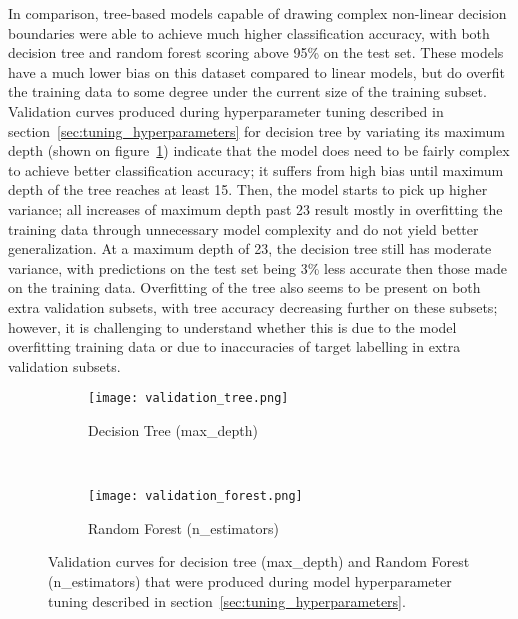In comparison, tree-based models capable of drawing complex non-linear decision boundaries were able to achieve much higher classification accuracy, with both decision tree and random forest scoring above 95\% on the test set.
These models have a much lower bias on this dataset compared to linear models, but do overfit the training data to some degree under the current size of the training subset.
Validation curves produced during hyperparameter tuning described in section~\ref{sec:tuning_hyperparameters} for decision tree by variating its maximum depth (shown on figure~\ref{fig:validation_tree}) indicate that the model does need to be fairly complex to achieve better classification accuracy;
it suffers from high bias until maximum depth of the tree reaches at least 15.
Then, the model starts to pick up higher variance;
all increases of maximum depth past 23 result mostly in overfitting the training data through unnecessary model complexity and do not yield better generalization.
At a maximum depth of 23, the decision tree still has moderate variance, with predictions on the test set being 3\% less accurate then those made on the training data.
Overfitting of the tree also seems to be present on both extra validation subsets, with tree accuracy decreasing further on these subsets;
however, it is challenging to understand whether this is due to the model overfitting training data or due to inaccuracies of target labelling in extra validation subsets.

\begin{figure}[hbt!]
    \centering
    \begin{subfigure}[t]{.47\textwidth}
        \centering
        \texttt{[image: validation\_tree.png]}
        \caption{Decision Tree (max\_depth)}
        \label{fig:validation_tree}
    \end{subfigure}
    ~ %
    \begin{subfigure}[t]{.48\textwidth}
        \centering
        \texttt{[image: validation\_forest.png]}
        \caption{Random Forest (n\_estimators)}
        \label{fig:validation_forest}
    \end{subfigure}
    \caption{Validation curves for decision tree (max\_depth) and Random Forest (n\_estimators) that were produced during model hyperparameter tuning described in section~\ref{sec:tuning_hyperparameters}.}
    \label{fig:validation_curves}
\end{figure}

